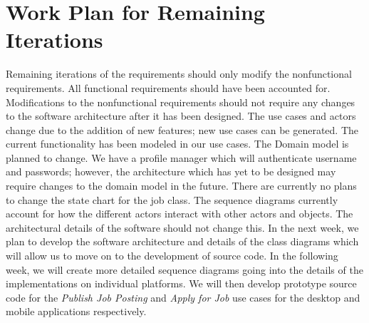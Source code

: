 \documentclass[12pt,openany]{report}
\begin{document}
\chapter{Work Plan for Remaining Iterations}
Remaining iterations of the requirements should only modify the nonfunctional
requirements. All functional requirements should have been accounted for. Modifications to
the nonfunctional requirements should not require any changes to the software architecture
after it has been designed.
The use cases and actors change due to the addition of new features; new use cases can
be generated. The current functionality has been modeled in our use cases.
The Domain model is planned to change. We have a profile manager which will
authenticate username and passwords; however, the architecture which has yet to be designed
may require changes to the domain model in the future.
There are currently no plans to change the state chart for the job class.
The sequence diagrams currently account for how the different actors interact with
other actors and objects. The architectural details of the software should not change this.
In the next week, we plan to develop the software architecture and details of the class
diagrams which will allow us to move on to the development of source code.
In the following week, we will create more detailed sequence diagrams going into the
details of the implementations on individual platforms. We will then develop prototype source
code for the \textit{Publish Job Posting} and \textit{Apply for Job} use cases for the desktop and mobile
applications respectively.
\end{document}
